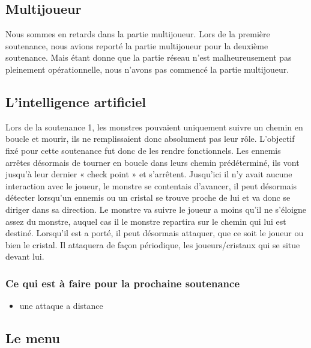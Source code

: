 \documentclass[a4paper, 12pt]{article}
\begin{document}
\newpage
	\subsection{Multijoueur}
	Nous sommes en retards dans la partie multijoueur. Lors de la première soutenance, nous avions reporté la partie multijoueur pour la deuxième soutenance. Mais étant donne que la partie réseau n’est malheureusement  pas pleinement opérationnelle, nous n’avons pas commencé la partie multijoueur. 

	
	\subsection{L'intelligence artificiel}
	Lors de la soutenance 1, les monstres pouvaient uniquement suivre un chemin en boucle et mourir, ils ne remplissaient donc absolument pas leur rôle. L’objectif fixé pour cette soutenance fut donc de les rendre fonctionnels. Les ennemis arrêtes désormais de tourner en boucle dans leurs chemin prédéterminé, ils vont jusqu’à leur dernier « check point » et s’arrêtent. Jusqu’ici il n’y avait aucune interaction avec le joueur, le monstre se contentais d’avancer, il peut désormais détecter lorsqu’un ennemis ou un cristal se trouve proche de lui et va donc se diriger dans sa direction. Le monstre va suivre le joueur a moins qu’il ne s’éloigne assez du monstre, auquel cas il le monstre repartira sur le chemin qui lui est destiné. Lorsqu’il est a porté, il peut désormais attaquer, que ce soit le joueur ou bien le cristal. Il attaquera de façon périodique, les joueurs/cristaux qui se situe devant lui.

	
\subsubsection*{Ce qui est à faire pour la prochaine soutenance}	
	
	\begin{itemize}
	\item une attaque a distance
	\end{itemize}


	\subsection{Le menu}
	
\end{document}
